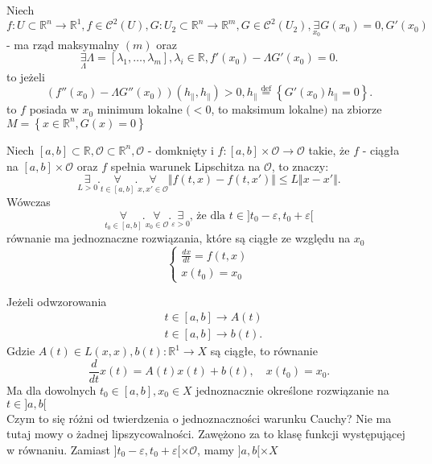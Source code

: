 \documentclass{article}
\begin{document}
\begin{tw}
Niech $f:U\subset \mathbb{R}^n \to \mathbb{R}^1, f\in \mathcal{C}^2(U), G: U_2\subset\mathbb{R}^n\to\mathbb{R}^m, G\in \mathcal{C}^2(U_2), \underset{x_0}{\exists} G(x_0) = 0, G'(x_0)$ - ma rząd maksymalny $(m)$ oraz \[
\underset{\Lambda}{\exists} \Lambda = \left[ \lambda_1,\ldots,\lambda_m \right], \lambda_i \in \mathbb{R}, f'(x_0) - \Lambda G'(x_0) = 0
.\] to jeżeli
\[
(f''(x_0)-\Lambda G''(x_0))(h_\parallel,h_\parallel) > 0,
h_\parallel \overset{\text{def}}{=} \left \{G'(x_0) h_\parallel = 0 \right \}
.\] to $f$ posiada w $x_0$ minimum lokalne $(<0$, to maksimum lokalne$)$ na zbiorze $M = \left\{ x\in \mathbb{R}^n, G(x) = 0 \right\} $
\end{tw}
\begin{tw}
Niech $[a,b] \subset \mathbb{R}, \mathcal{O}\subset\mathbb{R}^n, \mathcal{O}$ - domknięty i $f:[a,b]\times\mathcal{O}\to\mathcal{O}$ takie, że $f$ - ciągła na $[a,b]\times\mathcal{O}$ oraz $f$ spełnia warunek Lipschitza na $\mathcal{O}$, to znaczy:
\[
\underset{L>0}{\exists}. \underset{t\in[a,b]}{\forall}. \underset{x,x'\in\mathcal{O}}{\forall} \Vert f(t,x) - f(t,x') \Vert \leq L \Vert x-x' \Vert
.\] Wówczas \[
\underset{t_0\in[a,b]}{\forall} . \underset{x_0\in\mathcal{O}}{\forall} . \underset{\varepsilon>0}{\exists} \text{, że dla } t\in ]t_0-\varepsilon, t_0+\varepsilon[
\]
równanie ma jednoznaczne rozwiązania, które są ciągłe ze względu na $x_0$
\begin{equation}
\begin{cases}\label{eq:eq21}
\frac{dx}{dt} = f(t,x)\\
x(t_0) = x_0
\end{cases}
\end{equation}
\end{tw}
\begin{tw}
Jeżeli odwzorowania
\begin{align*}
&t\in [a,b]\to A(t)\\
&t\in [a,b]\to b(t)
.\end{align*}
Gdzie $A(t)\in L(x,x), b(t) : \mathbb{R}^1\to X$ są ciągłe, to równanie
\[
\frac{d}{dt}x(t) = A(t)x(t) + b(t),\quad x(t_0) = x_0
.\]
Ma dla dowolnych $t_0\in[a,b], x_0\in X$ jednoznacznie określone rozwiązanie na $t\in]a,b[$\\
Czym to się różni od twierdzenia o jednoznaczności warunku Cauchy? Nie ma tutaj mowy o żadnej lipszycowalności. Zawężono za to klasę funkcji występującej w równaniu. Zamiast $]t_0-\varepsilon,t_0+\varepsilon[\times \mathcal{O}$, mamy $]a,b[ \times X$
\end{tw}
\end{document}
